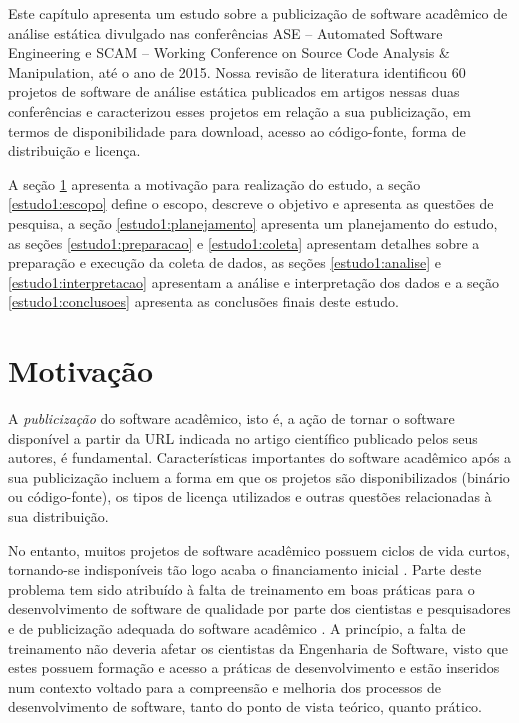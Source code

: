 \label{estudo1}

Este capítulo apresenta um estudo sobre a publicização de software acadêmico
de análise estática divulgado nas conferências ASE -- Automated Software Engineering e 
SCAM -- Working Conference on Source Code Analysis \& Manipulation, até o ano de 2015.
Nossa revisão de literatura identificou
60 projetos de software de análise estática
publicados em artigos nessas duas conferências e caracterizou esses
projetos em relação a sua publicização, em termos de disponibilidade para
download, acesso ao código-fonte, forma de distribuição e licença.

A seção \ref{estudo1:introducao} apresenta a motivação para realização do estudo,
a seção \ref{estudo1:escopo} define o escopo, descreve o objetivo e apresenta as questões de pesquisa,
a seção \ref{estudo1:planejamento} apresenta um planejamento do estudo,
as seções \ref{estudo1:preparacao} e \ref{estudo1:coleta} apresentam detalhes sobre a preparação e execução da coleta de dados,
as seções \ref{estudo1:analise} e \ref{estudo1:interpretacao} apresentam a análise e interpretação dos dados e
a seção \ref{estudo1:conclusoes} apresenta as conclusões finais deste estudo.

\section{Motivação} \label{estudo1:introducao} %

A \textit{publicização} do software acadêmico, isto é,
a ação de tornar o software disponível 
a partir da URL indicada no artigo científico publicado pelos seus autores,
é fundamental.
Características importantes do software acadêmico após a sua publicização
incluem a forma em que os projetos são disponibilizados (binário ou código-fonte),
os tipos de licença utilizados e outras questões relacionadas à sua distribuição.

No entanto, muitos projetos de software acadêmico possuem ciclos de vida curtos,
tornando-se indisponíveis tão logo acaba o financiamento inicial \cite{howison2015understanding}.
Parte deste problema tem sido atribuído à falta de treinamento em boas práticas
para o desenvolvimento de software de qualidade por parte dos cientistas e pesquisadores
\cite{wilson2017good}
e de publicização adequada do software acadêmico \cite{allen2017engineering}.
A princípio, a falta de treinamento não deveria afetar os cientistas da
Engenharia de Software, visto que estes possuem formação e acesso a práticas de
desenvolvimento e estão inseridos num contexto voltado para a compreensão e
melhoria dos processos de desenvolvimento de software, tanto do ponto de vista
teórico, quanto prático.

